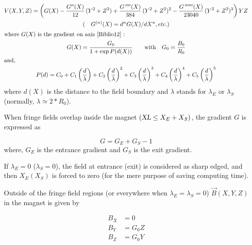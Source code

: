 { \begin{gather*}
 	V(X,Y,Z)     =   \left(G(X)- \dfrac{G^{\prime\prime}(X) }{ 12}\, (Y^2+Z^2)+
	             \dfrac{G^{\quaprime}(X) }{ 384}\, (Y^2+Z^2)^2-
	             \dfrac{G^{\cinqprime\prime}(X) }{ 23040}\, (Y^2+Z^2)^3 \right)YZ  \\
	(\quad G^{(n)}(X) =d^nG(X)/dX^n, etc.) \\
\intertext{where $ G(X) $ is the gradient on axis~\protect\cite{Biblio12}~:  } %
    G(X) = \dfrac{G_0 }{ 1+ \exp  P(d(X))}\qquad \text{with} \quad G_0=\dfrac{B_0}{R_0} \\
\intertext{and,}
     P(d) = C_0
       +C_1 \left(  \dfrac{d }{ \lambda} \right) 
       +C_2 \left( \dfrac{d }{ \lambda} \right)^2 
       + C_3 \left( \dfrac{d }{ \lambda} \right)^3 
       +C_4 \left( \dfrac{d }{ \lambda} \right)^4 
       + C_5 \left(\dfrac{d }{ \lambda} \right)^5
\end{gather*}
%
 where $ d(X) $ is the distance to the field boundary and $\lambda$
stands for $ \lambda_ E $ or $ \lambda_ S $ 
(normally, $ \lambda  \simeq  2  \ast  R_0$). 

\noindent When fringe fields overlap inside the magnet $ (\textsl{XL}\leq X_E+X_S)$,  
the gradient $ G $ is expressed as 

$$ G = G_E+G_S-1 $$
%
where, $ G_E $ is the entrance gradient and $ G_S $ is the exit gradient. 

\noindent If $ \lambda_ E=0$ ($\lambda_ S=0$),  the field at entrance 
(exit) is considered as sharp edged, and then $ X_E(X_S) $ is forced to zero 
(for the mere purpose of saving computing time). 

\noindent Outside of the fringe field regions (or everywhere when 
$ \lambda_E=\lambda_ S=0$)   $ \vec  B(X,Y,Z) $ in the magnet is given by 

\begin{align*}
	B_X &   =     0 \\
	B_Y &   =    G_0Z \\
	B_Z &   =     G_0Y  
\end{align*}

\newpage

}
